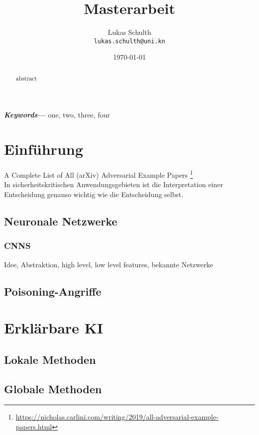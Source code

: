 \documentclass{article}
\title{Masterarbeit}
\author{
	
	Lukas Schulth\\
	\texttt{lukas.schulth@uni.kn}
}
\date{\today}
\theoremstyle{break}
\providecommand{\keywords}[1]
{
	\small	
	\textbf{\textit{Keywords---}} #1
}
\begin{document}
	\maketitle
	
	\newpage
	\begin{abstract}
		abstract
	\end{abstract}
	\keywords{one, two, three, four}
	\newpage
	
	\listoffigures
	
	\listoftables
	
	\lstlistoflistings
	
	\newpage
	\tableofcontents
	\newpage
	

	
	
	
	\section{Einführung}
	
	A Complete List of All (arXiv) Adversarial Example Papers \footnote{\url{https://nicholas.carlini.com/writing/2019/all-adversarial-example-papers.html}}
	\\
	In sicherheitskritischen Anwendungsgebieten ist die Interpretation einer Entscheidung genauso wichtig wie die Entscheidung selbst\cite{LRP_DNN}.
	\subsection{Neuronale Netzwerke}
	
	\subsubsection{CNNS}
	Idee, Abstraktion, high level, low level features, bekannte Netzwerke
	
	
	\subsection{Poisoning-Angriffe}
	
	\section{Erklärbare KI}
	
	\subsection{Lokale Methoden}
	
	\subsection{Globale Methoden}
	
\end{document}
